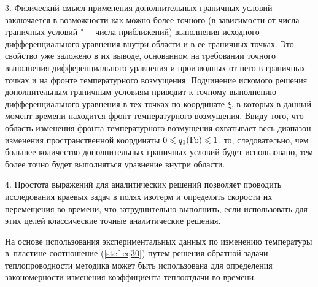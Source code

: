 3. Физический смысл применения дополнительных граничных условий заключается 
в возможности как можно более точного (в зависимости от числа граничных 
условий "--- числа приближений) выполнения исходного дифференциального 
уравнения внутри области и в ее граничных точках. Это свойство уже заложено 
в их выводе, основанном на требовании точного выполнения дифференциального 
уравнения и производных от него в граничных точках и на фронте 
температурного возмущения. Подчинение искомого решения дополнительным 
граничным условиям приводит к точному выполнению дифференциального уравнения 
в тех точках по координате $\xi $, в которых в данный момент времени 
находится фронт температурного возмущения. Ввиду того, что область изменения 
фронта температурного возмущения охватывает весь диапазон изменения 
пространственной координаты $0\leqslant q_1 
({\rm Fo})\leqslant 1$, то, следовательно, чем большее 
количество дополнительных граничных условий будет использовано, тем более 
точно будет выполняться уравнение внутри области. 

4. Простота выражений для аналитических решений позволяет проводить 
исследования краевых задач в полях изотерм и определять скорости их 
перемещения во времени, что затруднительно выполнить, если использовать для 
этих целей классические точные аналитические решения. 

На основе использования экспериментальных данных по изменению температуры 
в~пластине соотношение (\ref{stef-eq30}) путем решения обратной задачи теплопроводности 
методика может быть использована для определения закономерности изменения 
коэффициента теплоотдачи во времени.


